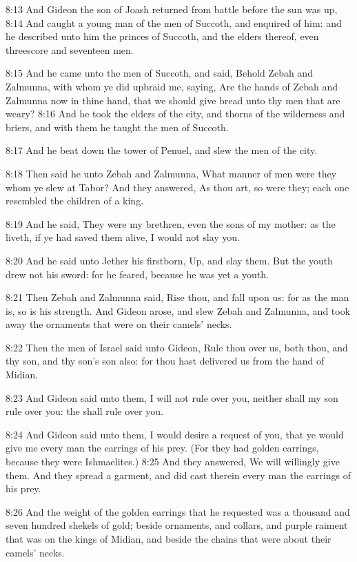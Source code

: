 8:13 And Gideon the son of Joash returned from battle before the sun
was up, 8:14 And caught a young man of the men of Succoth, and
enquired of him: and he described unto him the princes of Succoth, and
the elders thereof, even threescore and seventeen men.

8:15 And he came unto the men of Succoth, and said, Behold Zebah and
Zalmunna, with whom ye did upbraid me, saying, Are the hands of Zebah
and Zalmunna now in thine hand, that we should give bread unto thy men
that are weary?  8:16 And he took the elders of the city, and thorns
of the wilderness and briers, and with them he taught the men of
Succoth.

8:17 And he beat down the tower of Penuel, and slew the men of the
city.

8:18 Then said he unto Zebah and Zalmunna, What manner of men were
they whom ye slew at Tabor? And they answered, As thou art, so were
they; each one resembled the children of a king.

8:19 And he said, They were my brethren, even the sons of my mother:
as the \LORD liveth, if ye had saved them alive, I would not slay you.

8:20 And he said unto Jether his firstborn, Up, and slay them. But the
youth drew not his sword: for he feared, because he was yet a youth.

8:21 Then Zebah and Zalmunna said, Rise thou, and fall upon us: for as
the man is, so is his strength. And Gideon arose, and slew Zebah and
Zalmunna, and took away the ornaments that were on their camels'
necks.

8:22 Then the men of Israel said unto Gideon, Rule thou over us, both
thou, and thy son, and thy son's son also: for thou hast delivered us
from the hand of Midian.

8:23 And Gideon said unto them, I will not rule over you, neither
shall my son rule over you: the \LORD shall rule over you.

8:24 And Gideon said unto them, I would desire a request of you, that
ye would give me every man the earrings of his prey. (For they had
golden earrings, because they were Ishmaelites.)  8:25 And they
answered, We will willingly give them. And they spread a garment, and
did cast therein every man the earrings of his prey.

8:26 And the weight of the golden earrings that he requested was a
thousand and seven hundred shekels of gold; beside ornaments, and
collars, and purple raiment that was on the kings of Midian, and
beside the chains that were about their camels' necks.

